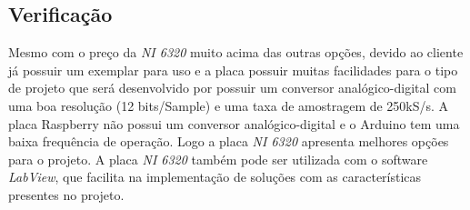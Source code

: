 \subsection{Verificação}

Mesmo com o preço da \textit{NI 6320} muito acima das outras opções, devido ao cliente já possuir um exemplar para uso e a placa possuir muitas facilidades para o tipo de projeto que será desenvolvido por possuir um conversor analógico-digital com uma boa resolução (12 bits/Sample) e uma taxa de amostragem de 250kS/s. A placa Raspberry não possui um conversor analógico-digital e o Arduino tem uma baixa frequência de operação. Logo a placa \textit{NI 6320} apresenta melhores opções para o projeto.
A placa \textit{NI 6320} também pode ser utilizada com o software \textit{LabView}, que facilita na implementação de soluções com as características presentes no projeto.

